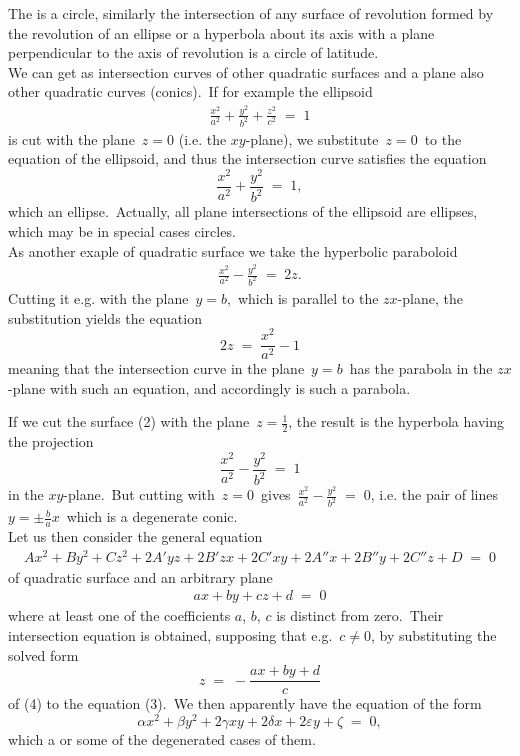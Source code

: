 \documentclass[12pt]{article}
\theoremstyle{definition}
\begin{document}
The  is a circle, similarly the intersection of any surface of revolution formed by the revolution of an ellipse or a hyperbola about its axis with a plane perpendicular to the axis of revolution is a circle of latitude.\\

We can get as intersection curves of other quadratic surfaces and a plane also other quadratic curves (conics).\, If for example the ellipsoid
\begin{align}
\frac{x^2}{a^2}+\frac{y^2}{b^2}+\frac{z^2}{c^2} \;=\; 1
\end{align}
is cut with the plane\, $z = 0$ (i.e. the $xy$-plane), we substitute\, $z = 0$\, to the equation of the ellipsoid, and thus the intersection curve satisfies the equation 
$$\frac{x^2}{a^2}+\frac{y^2}{b^2} \;=\; 1,$$
which  an ellipse.\, Actually, all plane intersections of the ellipsoid are ellipses, which may be in special cases circles.\\

As another exaple of quadratic surface we take the hyperbolic paraboloid
\begin{align}
\frac{x^2}{a^2}-\frac{y^2}{b^2} \;=\; 2z.
\end{align}
Cutting it e.g. with the plane\, $y = b$,\, which is parallel to the $zx$-plane, the substitution yields the equation
$$2z \;=\; \frac{x^2}{a^2}-1$$
meaning that the intersection curve in the plane\, $y = b$\, has the  parabola in the $zx$-plane with such an equation, and accordingly is such a parabola.

If we cut the surface (2) with the plane\, $z = \frac{1}{2}$, the result is the hyperbola
having the projection
$$\frac{x^2}{a^2}-\frac{y^2}{b^2} \;=\; 1$$
in the $xy$-plane.\, But cutting with\, $z = 0$\, gives\, $\frac{x^2}{a^2}-\frac{y^2}{b^2} \;=\; 0$, i.e. the pair of 
lines \,$y = \pm\frac{b}{a}x$\, which is a degenerate conic.\\

Let us then consider the general equation 
\begin{align}
Ax^2+By^2+Cz^2+2A'yz+2B'zx+2C'xy+2A''x+2B''y+2C''z+D \;=\; 0
\end{align}
of quadratic surface and an arbitrary plane
\begin{align}
ax\!+\!by\!+\!cz\!+\!d \;=\; 0
\end{align}
where at least one of the coefficients $a$, $b$, $c$ is distinct from zero.\, Their intersection equation is obtained, supposing that e.g.\, $c \neq 0$, by substituting the solved form
$$z \;=\; -\frac{ax\!+\!by\!+\!d}{c}$$
of (4) to the equation (3).\, We then apparently have the equation of the form
$$\alpha x^2+\beta y^2+2\gamma xy +2\delta x+2\varepsilon y+\zeta \;=\; 0,$$
which  a  or some of the degenerated cases of them.





\end{document}
